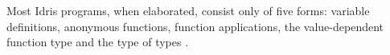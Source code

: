 Most Idris programs, when elaborated, consist only of five forms:
variable definitions, anonymous functions, function applications,
the value-dependent function type and the type of types
\cite{stephanieweirich}.
